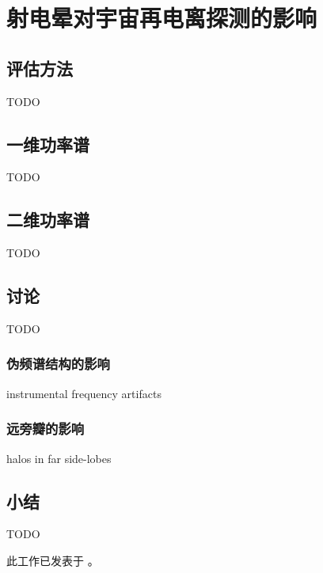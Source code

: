 
\chapter{射电晕对宇宙再电离探测的影响}
\label{chap:halo}

\section{评估方法}

TODO


\section{一维功率谱}

TODO


\section{二维功率谱}

TODO


\section{讨论}

TODO

\subsection{伪频谱结构的影响}

instrumental frequency artifacts

\subsection{远旁瓣的影响}

halos in far side-lobes


\section{小结}

TODO

此工作已发表于 \apj \cite{li2018halo}。



